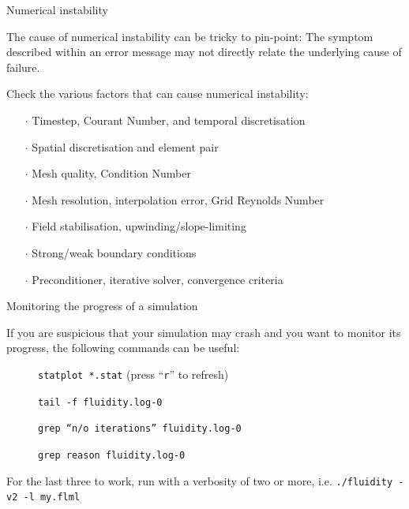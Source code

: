 \documentclass[t]{beamer}
\begin{document}
\begin{frame}{Numerical instability}

The cause of numerical instability can be tricky to pin-point:
The symptom described within an error message may not directly relate the underlying cause of failure.

\vspace{1ex}
Check the various factors that can cause numerical instability:
\begin{itemize}
 \item[$\cdot$] Timestep, Courant Number, and temporal discretisation
 \item[$\cdot$] Spatial discretisation and element pair
 \item[$\cdot$] Mesh quality, Condition Number
 \item[$\cdot$] Mesh resolution, interpolation error, Grid Reynolds Number
 \item[$\cdot$] Field stabilisation, upwinding/slope-limiting
 \item[$\cdot$] Strong/weak boundary conditions
 \item[$\cdot$] Preconditioner, iterative solver, convergence criteria
\end{itemize}

\end{frame}


\begin{frame}{Monitoring the progress of a simulation}

If you are suspicious that your simulation may crash and you want to monitor its progress,
the following commands can be useful:

\vspace{1ex}
\begin{description}
 \item[] {\tt statplot *.stat} (press ``{\tt r}'' to refresh)
 \item[] {\tt tail -f fluidity.log-0}
 \item[] {\tt grep ``n/o iterations'' fluidity.log-0}
 \item[] {\tt grep reason fluidity.log-0}
\end{description}

For the last three to work, run with a verbosity of two or more, 
i.e. {\tt ./fluidity -v2 -l my.flml}

\end{frame}
\end{document}

